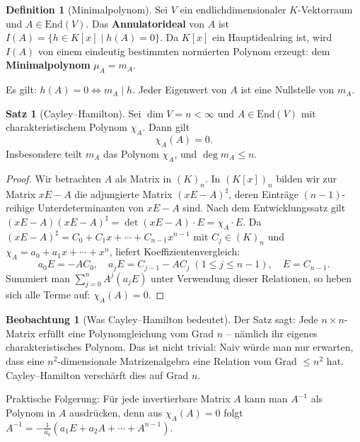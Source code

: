 ﻿\documentclass[a4paper,12pt]{report}
\theoremstyle{definition}
\newtheorem{definition}{Definition}
\newtheorem{satz}{Satz}
\newtheorem{beobachtung}{Beobachtung}
\begin{document}
\begin{definition}[Minimalpolynom]
    Sei $V$ ein endlichdimensionaler $K$-Vektorraum und $A \in \mathrm{End}(V)$.
    Das \textbf{Annulatorideal} von $A$ ist
    $I(A) = \{h \in K[x] \mid h(A) = 0\}$.
    Da $K[x]$ ein Hauptidealring ist, wird $I(A)$ von einem eindeutig
    bestimmten normierten Polynom erzeugt: dem
    \textbf{Minimalpolynom} $\mu_A = m_A$.

    Es gilt: $h(A) = 0 \Leftrightarrow m_A \mid h$.
    Jeder Eigenwert von $A$ ist eine Nullstelle von $m_A$.
\end{definition}

\begin{satz}[Cayley--Hamilton]
    Sei $\dim V = n < \infty$ und $A \in \mathrm{End}(V)$ mit
    charakteristischem Polynom $\chi_A$. Dann gilt
    \[
        \chi_A(A) = 0.
    \]
    Insbesondere teilt $m_A$ das Polynom $\chi_A$, und $\deg m_A \leq n$.
\end{satz}
\begin{proof}
    Wir betrachten $A$ als Matrix in $(K)_n$. In $(K[x])_n$ bilden wir
    zur Matrix $xE - A$ die adjungierte Matrix $(xE - A)^\sharp$,
    deren Einträge $(n{-}1)$-reihige Unterdeterminanten von $xE - A$ sind.
    Nach dem Entwicklungssatz gilt $(xE - A)(xE - A)^\sharp = \det(xE-A) \cdot E
    = \chi_A \cdot E$.
    Da $(xE - A)^\sharp = C_0 + C_1 x + \cdots + C_{n-1} x^{n-1}$ mit $C_j \in (K)_n$
    und $\chi_A = a_0 + a_1 x + \cdots + x^n$, liefert Koeffizientenvergleich:
    \[
        a_0 E = -AC_0, \quad a_j E = C_{j-1} - AC_j \; (1 \leq j \leq n-1), \quad E = C_{n-1}.
    \]
    Summiert man $\sum_{j=0}^n A^j(a_j E)$ unter Verwendung dieser Relationen,
    so heben sich alle Terme auf: $\chi_A(A) = 0$.
\end{proof}

\begin{beobachtung}[Was Cayley--Hamilton bedeutet]
    Der Satz sagt: Jede $n \times n$-Matrix erfüllt eine Polynomgleichung
    vom Grad $n$ -- nämlich ihr eigenes charakteristisches Polynom.
    Das ist nicht trivial: Naiv würde man nur erwarten, dass eine
    $n^2$-dimensionale Matrizenalgebra eine Relation vom Grad $\leq n^2$ hat.
    Cayley--Hamilton verschärft dies auf Grad $n$.

    Praktische Folgerung: Für jede invertierbare Matrix $A$ kann man $A^{-1}$
    als Polynom in $A$ ausdrücken, denn aus $\chi_A(A) = 0$ folgt
    $A^{-1} = -\frac{1}{a_0}(a_1 E + a_2 A + \cdots + A^{n-1})$.
\end{beobachtung}
\end{document}
